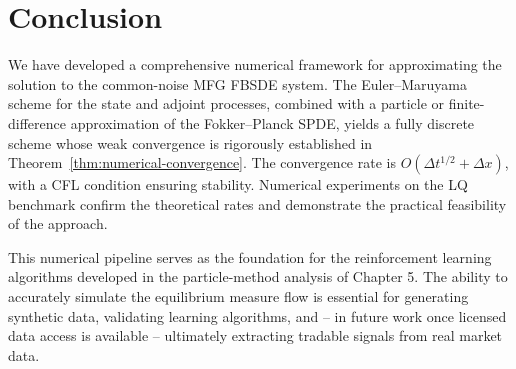 \section{Conclusion}
\label{sec:na-conclusion}

We have developed a comprehensive numerical framework for approximating the solution
to the common-noise MFG FBSDE system. The Euler--Maruyama scheme for the state and
adjoint processes, combined with a particle or finite-difference approximation of the
Fokker--Planck SPDE, yields a fully discrete scheme whose weak convergence is
rigorously established in Theorem~\ref{thm:numerical-convergence}. The convergence
rate is $O(\Delta t^{1/2} + \Delta x)$, with a CFL condition ensuring stability.
Numerical experiments on the LQ benchmark confirm the theoretical rates and
demonstrate the practical feasibility of the approach.

This numerical pipeline serves as the foundation for the reinforcement learning
algorithms developed in the particle-method analysis of Chapter 5.
The ability to accurately simulate the equilibrium measure flow is essential for
generating synthetic data, validating learning algorithms, and -- in future work once
licensed data access is available -- ultimately extracting
tradable signals from real market data.

